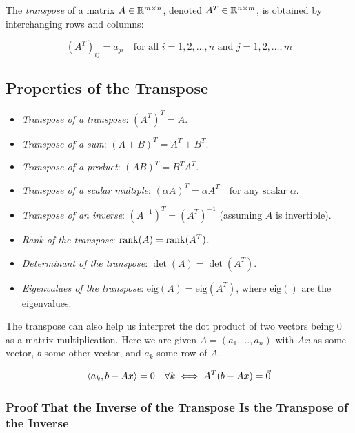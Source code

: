 The \emph{transpose} of a matrix \(A \in \mathbb{R}^{m \times n}\), denoted \(A^T \in \mathbb{R}^{n \times m}\), is obtained by interchanging rows and columns:

\[
    {(A^T)}_{ij} = a_{ji} \quad \text{for all } i = 1, 2, \ldots, n \text{ and } j = 1, 2, \ldots, m
\]

\subsection{Properties of the Transpose}

\begin{itemize}

    \item  \emph{Transpose of a transpose}: \({(A^T)}^T = A\).

    \item  \emph{Transpose of a sum}: \({(A + B)}^T = A^T + B^T\).

    \item  \emph{Transpose of a product}: \({(AB)}^T = B^T A^T\).

    \item  \emph{Transpose of a scalar multiple}: \({(\alpha A)}^T = \alpha A^T \quad \text{for any scalar } \alpha\).

    \item  \emph{Transpose of an inverse}: \({(A^{-1})}^T = (A^T)^{-1}\) (assuming \(A\) is invertible).

    \item  \emph{Rank of the transpose}: \(\mathrm{rank}(A) = \mathrm{rank}(A^T)\).

    \item  \emph{Determinant of the transpose}: \(\det(A) = \det(A^T)\).

    \item  \emph{Eigenvalues of the transpose}: \(\mathrm{eig}(A) = \mathrm{eig}(A^T)\), where \(\mathrm{eig}()\) are the eigenvalues.

\end{itemize}

The transpose can also help us interpret the dot product of two vectors being 0 as a matrix multiplication.
Here we are given \(A = (a_1, \dots, a_n)\) with \(Ax\) as some vector, \(b\) some other vector, and
\(a_k\) some row of \(A\).

\[
    \left\langle a_k, b - Ax\right\rangle = 0 \quad \forall k \iff A^{T} (b - Ax) = \vec{0}
\]

\subsubsection{Proof That the Inverse of the Transpose Is the Transpose of the Inverse}

